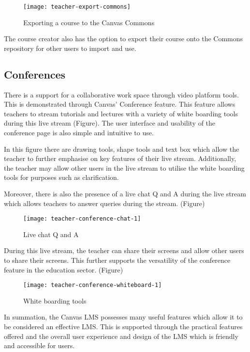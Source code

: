 \begin{figure}[h!]
\centering
\texttt{[image: teacher-export-commons]}
\caption{Exporting a course to the Canvas Commons}
\end{figure}

The course creator also has the option to export their course onto the Commons repository for other users to import and use. 

\clearpage
 
\subsection{Conferences}
There is a support for a collaborative work space through video platform tools. This is demonstrated through Canvas’ 
Conference feature. This feature allows teachers to stream tutorials and lectures with a variety of white boarding 
tools during this live stream (Figure). The user interface and usability of the conference page is also simple and intuitive to use.

In this figure there are drawing tools, shape tools and text box which allow the teacher to further emphasise on key 
features of their live stream. Additionally, the teacher may allow other users in the live stream to utilise the 
white boarding tools for purposes such as clarification. 

Moreover, there is also the presence of a live chat Q and A during the live stream which allows teachers to answer 
queries during the stream. (Figure)

\begin{figure}[h!]
\centering
\texttt{[image: teacher-conference-chat-1]}
\caption{Live chat Q and A}
\end{figure}

During this live stream, the teacher can share their screens and allow other users to share their screens. This 
further supports the versatility of the conference feature in the education sector. (Figure)

\begin{figure}[h!]
\centering
\texttt{[image: teacher-conference-whiteboard-1]}
\caption{White boarding tools}
\end{figure}

In summation, the Canvas LMS possesses many useful features which allow it to be considered an effective LMS. 
This is supported through the practical features offered and the overall user experience and design of the LMS 
which is friendly and accessible for users. 
